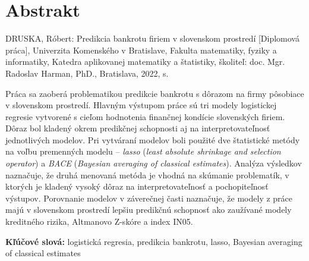 \thispagestyle{empty}
\section*{Abstrakt}
DRUSKA, Róbert: Predikcia bankrotu firiem v slovenskom prostredí [Diplomová práca],
Univerzita Komenského v Bratislave,
Fakulta matematiky, fyziky a informatiky,
Katedra aplikovanej matematiky a štatistiky,
školiteľ: doc. Mgr. Radoslav Harman, PhD.,
Bratislava, 2022, \textnormal{\pageref*{LastPage}} s.

Práca sa zaoberá problematikou predikcie bankrotu s dôrazom na firmy pôsobiace v slovenskom prostredí.
Hlavným výstupom práce sú tri modely logistickej regresie vytvorené s cieľom hodnotenia finančnej kondície slovenských firiem.
Dôraz bol kladený okrem predikčnej schopnosti aj na interpretovateľnosť jednotlivých modelov.
Pri vytváraní modelov boli použité dve štatistické metódy na voľbu premenných modelu – \emph{lasso} (\emph{least absolute shrinkage and selection operator}) a
\emph{BACE} (\emph{Bayesian averaging of classical estimates}).
Analýza výsledkov naznačuje, že druhá menovaná metóda je vhodná na skúmanie problematík, v ktorých je kladený vysoký dôraz na interpretovateľnosť a pochopiteľnosť výstupov.
Porovnanie modelov v záverečnej časti naznačuje, že modely z práce majú v slovenskom prostredí lepšiu predikčnú schopnosť ako zaužívané modely kreditného rizika,
Altmanovo Z-skóre a index IN05.

\begin{flushleft}
  \textbf{Kľúčové slová:} logistická regresia, predikcia bankrotu, lasso, Bayesian averaging of classical estimates
\end{flushleft}